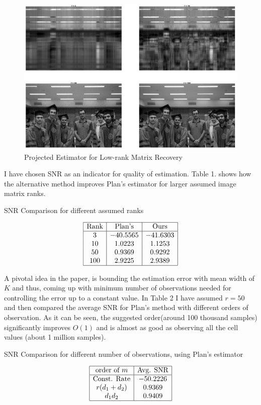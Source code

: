 \documentclass{amsart}
\theoremstyle{definition}
\theoremstyle{remark}
\numberwithin{equation}{section}
\newcommand{\blankbox}[2]{%
  \parbox{\columnwidth}{\centering
    \setlength{\fboxsep}{0pt}%
    \fbox{\raisebox{0pt}[#2]{\hspace{#1}}}%
  }%
}
\begin{document}
\begin{figure}[tb]
\includegraphics{Parnians.png}
\caption{Projected Estimator for Low-rank Matrix Recovery}
\label{firstfig}
\end{figure}

I have chosen SNR as an indicator for quality of estimation. Table 1. shows how the alternative method improves Plan's estimator for larger assumed image matrix ranks.

\begin{table}[ht]
\caption{SNR Comparison for different assumed ranks}\label{eqtable}
\renewcommand\arraystretch{1.5}
\noindent\[
\begin{array}{|c|c|c|}
\hline
\text{Rank}&\text{Plan's}&\text{Ours}\\
\hline
{3}&-40.5565& -41.6303\\
{10}&1.0223&1.1253\\
{50}&0.9369&0.9292\\
{100}&2.9225 &2.9389\\ 

\hline
\end{array}
\]
\end{table}

A pivotal idea in the paper, is bounding the estimation error with mean width of $K$ and thus, coming up with minimum number of observations needed for controlling the error up to a constant value. In Table 2 I have assumed $r=50$ and then compared the average SNR for Plan's method with different orders of observation. As it can be seen, the suggested order(around 100 thousand samples) significantly improves $O(1)$ and is almost as good as observing all the cell values (about 1 million samples).
\begin{table}[ht]
\caption{SNR Comparison for different number of observations, using Plan's estimator}\label{eqtable}
\renewcommand\arraystretch{1.5}
\noindent\[
\begin{array}{|c|c|c|}
\hline
{\text{order of } m}&{\text{Avg. SNR}}\\
\hline
{\text{Const. Rate}}&  -50.2226\\
{r(d_1+d_2)}&0.9369\\
{d_1d_2}&0.9409 \\

\hline
\end{array}
\]
\end{table}
\end{document}
